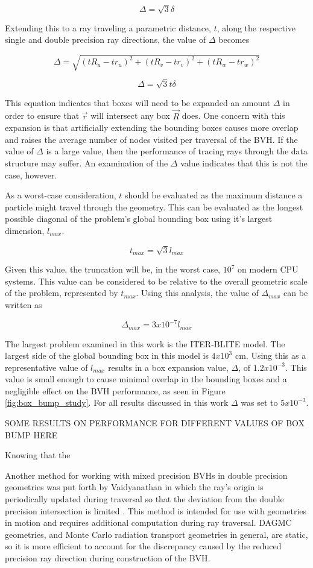 $$ \Delta = \sqrt{3} \delta $$

Extending this to a ray traveling a parametric distance, $t$, along the
respective single and double precision ray directions, the value of $\Delta$
becomes

$$ \Delta = \sqrt{ (tR_{u} - tr_{u})^{2} + (tR_{v} - tr_{v})^{2} + (tR_{w} -
  tr_{w})^{2} } $$

$$ \Delta = \sqrt{3} t \delta $$

This equation indicates that boxes will need to be expanded an amount $\Delta$
in order to ensure that $\vec{r}$ will intersect any box $\vec{R}$ does. One
concern with this expansion is that artificially extending the bounding boxes
causes more overlap and raises the average number of nodes visited per traversal
of the BVH. If the value of $\Delta$ is a large value, then the performance of
tracing rays through the data structure may suffer. An examination of the
$\Delta$ value indicates that this is not the case, however.

As a worst-case consideration, $t$ should be evaluated as the maximum distance a
particle might travel through the geometry. This can be evaluated as the longest
possible diagonal of the problem's global bounding box using it's largest
dimension, $l_{max}$.

$$ t_{max} = \sqrt{3} l_{max} $$

Given this value, the truncation will be, in the worst case, $10^{7}$ on modern
CPU systems. This value can be considered to be relative to the overall
geometric scale of the problem, represented by $t_{max}$. Using this analysis,
the value of $\Delta_{max}$ can be written as 

$$\Delta_{max} = 3 x 10^{-7} l_{max} $$

The largest problem examined in this work is the ITER-BLITE model. The largest
side of the global bounding box in this model is $4 x 10^{3}$ cm. Using this as a
representative value of $l_{max}$ results in a box expansion value, $\Delta$, of
$1.2 x 10^{-3}$. This value is small enough to cause minimal overlap in the
bounding boxes and a negligible effect on the BVH performance, as seen in Figure
\ref{fig:box_bump_study}. For all results discussed in this work $\Delta$ was
set to $5 x 10 ^{-3}$.

SOME RESULTS ON PERFORMANCE FOR DIFFERENT VALUES OF BOX BUMP HERE

Knowing that the 

Another method for working with mixed precision BVHs in double precision
geometries was put forth by Vaidyanathan in which the ray's origin is
periodically updated during traversal so that the deviation from the double
precision intersection is limited \cite{Vaidyanathan_2016}. This method is
intended for use with geometries in motion and requires additional computation
during ray traversal. DAGMC geometries, and Monte Carlo radiation transport
geometries in general, are static, so it is more efficient to account for the
discrepancy caused by the reduced precision ray direction during construction of
the BVH.

